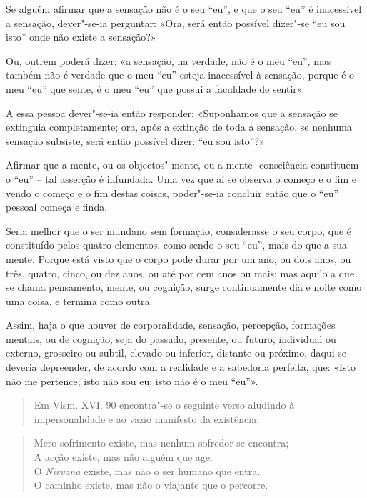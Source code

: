 Se alguém afirmar que a sensação não é o seu “eu”, e que o seu “eu” é
inacessível a sensação, dever"-se-ia perguntar: «Ora, será então possível
dizer"-se “eu sou isto” onde não existe a sensação?»

Ou, outrem poderá dizer: «a sensação, na verdade, não é o meu “eu”, mas também
não é verdade que o meu “eu” esteja inacessível à sensação, porque é o meu
“eu” que sente, é o meu “eu” que possui a faculdade de sentir».

A essa pessoa dever"-se-ia então responder: «Suponhamos que a sensação se
extinguia completamente; ora, após a extinção de toda a sensação, se nenhuma
sensação subsiste, será então possível dizer: “eu sou isto”?»


Afirmar que a mente, ou os objectos"-mente, ou a mente- consciência constituem o
“eu” -- tal asserção é infundada. Uma vez que aí se observa o começo e o fim e
vendo o começo e o fim destas coisas, poder"-se-ia concluir então que o “eu”
pessoal começa e finda.


Seria melhor que o ser mundano sem formação, considerasse o seu corpo, que é
constituído pelos quatro elementos, como sendo o seu “eu”, mais do que a sua
mente. Porque está visto que o corpo pode durar por um ano, ou dois anos, ou
três, quatro, cinco, ou dez anos, ou até por cem anos ou mais; mas aquilo a que
se chama pensamento, mente, ou cognição, surge continuamente dia e noite como
uma coisa, e termina como outra.


Assim, haja o que houver de corporalidade, sensação, percepção, formações
mentais, ou de cognição, seja do passado, presente, ou futuro, individual ou
externo, grosseiro ou subtil, elevado ou inferior, distante ou próximo, daqui se
deveria depreender, de acordo com a realidade e a sabedoria perfeita, que: «Isto
não me pertence; isto não sou eu; isto não é o meu “eu”».


\begin{quote}
  Em Vism. XVI, 90 encontra"-se o seguinte verso aludindo à impersonalidade e ao
  vazio manifesto da existência:
\end{quote}

\begin{verse}
  Mero sofrimento existe, mas nenhum sofredor se encontra;\\
  A acção existe, mas não alguém que age.\\
  O \emph{Nirvāna} existe, mas não o ser humano que entra.\\
  O caminho existe, mas não o viajante que o percorre.
\end{verse}

